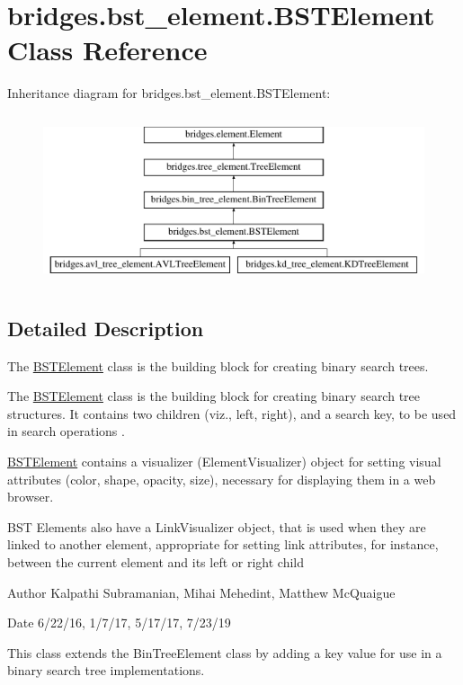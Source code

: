 \hypertarget{classbridges_1_1bst__element_1_1_b_s_t_element}{}\section{bridges.\+bst\+\_\+element.\+B\+S\+T\+Element Class Reference}
\label{classbridges_1_1bst__element_1_1_b_s_t_element}
Inheritance diagram for bridges.\+bst\+\_\+element.\+B\+S\+T\+Element\+:\begin{figure}[H]
\begin{center}
\leavevmode
\includegraphics[height=5.000000cm]{classbridges_1_1bst__element_1_1_b_s_t_element}
\end{center}
\end{figure}


\subsection{Detailed Description}
The \mbox{\hyperlink{classbridges_1_1bst__element_1_1_b_s_t_element}{B\+S\+T\+Element}} class is the building block for creating binary search trees. 

The \mbox{\hyperlink{classbridges_1_1bst__element_1_1_b_s_t_element}{B\+S\+T\+Element}} class is the building block for creating binary search tree structures. It contains two children (viz., left, right), and a search key, to be used in search operations .

\mbox{\hyperlink{classbridges_1_1bst__element_1_1_b_s_t_element}{B\+S\+T\+Element}} contains a visualizer (Element\+Visualizer) object for setting visual attributes (color, shape, opacity, size), necessary for displaying them in a web browser.

B\+ST Elements also have a Link\+Visualizer object, that is used when they are linked to another element, appropriate for setting link attributes, for instance, between the current element and its left or right child

\begin{DoxyAuthor}{Author}
Kalpathi Subramanian, Mihai Mehedint, Matthew Mc\+Quaigue
\end{DoxyAuthor}
\begin{DoxyDate}{Date}
6/22/16, 1/7/17, 5/17/17, 7/23/19
\end{DoxyDate}
This class extends the Bin\+Tree\+Element class by adding a \textquotesingle{}key\textquotesingle{} value for use in a binary search tree implementations.

